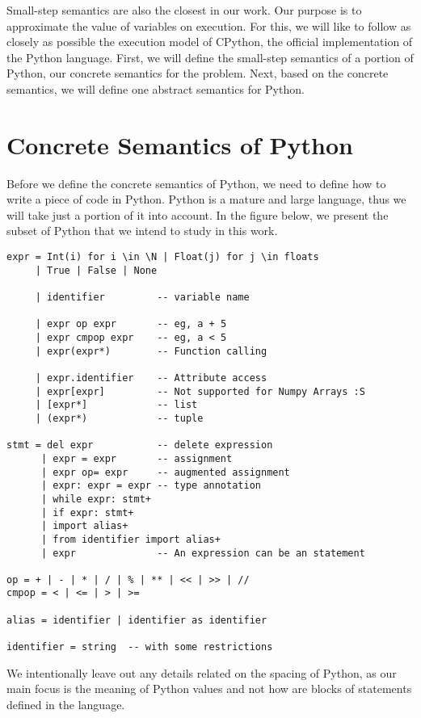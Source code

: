 Small-step semantics are also the closest in our work. Our purpose is to approximate the
value of variables on execution. For this, we will like to follow as closely as possible
the execution model of CPython, the official implementation of the Python language. First,
we will define the small-step semantics of a portion of Python, our concrete semantics
for the problem. Next, based on the concrete semantics, we will define one abstract
semantics for Python.

\section{Concrete Semantics of Python}

Before we define the concrete semantics of Python, we need to define how to write a piece
of code in Python. Python is a mature and large language, thus we will take just a portion
of it into account. In the figure below, we present the subset of Python that we intend to
study in this work.

\begin{verbatim}
expr = Int(i) for i \in \N | Float(j) for j \in floats
     | True | False | None

     | identifier         -- variable name

     | expr op expr       -- eg, a + 5
     | expr cmpop expr    -- eg, a < 5
     | expr(expr*)        -- Function calling

     | expr.identifier    -- Attribute access
     | expr[expr]         -- Not supported for Numpy Arrays :S
     | [expr*]            -- list
     | (expr*)            -- tuple

stmt = del expr           -- delete expression
      | expr = expr       -- assignment
      | expr op= expr     -- augmented assignment
      | expr: expr = expr -- type annotation
      | while expr: stmt+
      | if expr: stmt+
      | import alias+
      | from identifier import alias+
      | expr              -- An expression can be an statement

op = + | - | * | / | % | ** | << | >> | //
cmpop = < | <= | > | >=

alias = identifier | identifier as identifier

identifier = string  -- with some restrictions
\end{verbatim}

We intentionally leave out any details related on the spacing of Python, as our main focus
is the meaning of Python values and not how are blocks of statements defined in the
language.

